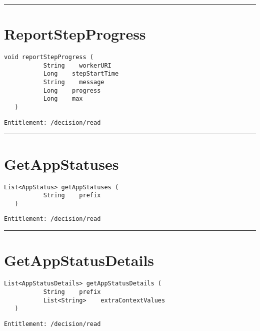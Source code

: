 \rule{12cm}{2pt}
\section{ReportStepProgress}
\label{Api:ReportStepProgress}
\begin{lstlisting}[style=nonumbers]
   void reportStepProgress (
           String    workerURI
           Long    stepStartTime
           String    message
           Long    progress
           Long    max
   )
\end{lstlisting}
\begin{Verbatim}[formatcom=\color{Maroon}]
  Entitlement: /decision/read
\end{Verbatim}



\rule{12cm}{2pt}
\section{GetAppStatuses}
\label{Api:GetAppStatuses}
\begin{lstlisting}[style=nonumbers]
   List<AppStatus> getAppStatuses (
           String    prefix
   )
\end{lstlisting}
\begin{Verbatim}[formatcom=\color{Maroon}]
  Entitlement: /decision/read
\end{Verbatim}



\rule{12cm}{2pt}
\section{GetAppStatusDetails}
\label{Api:GetAppStatusDetails}
\begin{lstlisting}[style=nonumbers]
   List<AppStatusDetails> getAppStatusDetails (
           String    prefix
           List<String>    extraContextValues
   )
\end{lstlisting}
\begin{Verbatim}[formatcom=\color{Maroon}]
  Entitlement: /decision/read
\end{Verbatim}



